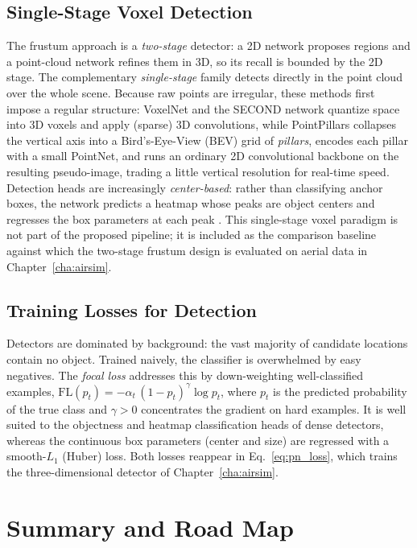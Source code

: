 \subsection{Single-Stage Voxel Detection}

The frustum approach is a \emph{two-stage} detector: a 2D network proposes
regions and a point-cloud network refines them in 3D, so its recall is bounded by
the 2D stage. The complementary \emph{single-stage} family detects directly in
the point cloud over the whole scene. Because raw points are irregular, these
methods first impose a regular structure: VoxelNet and the SECOND network
\cite{yan2018second} quantize space into 3D voxels and apply (sparse) 3D
convolutions, while PointPillars \cite{lang2019pointpillars} collapses the
vertical axis into a Bird's-Eye-View (BEV) grid of \emph{pillars}, encodes each
pillar with a small PointNet, and runs an ordinary 2D convolutional backbone on
the resulting pseudo-image, trading a little vertical resolution for real-time
speed. Detection heads are increasingly \emph{center-based}: rather than
classifying anchor boxes, the network predicts a heatmap whose peaks are object
centers and regresses the box parameters at each peak \cite{zhou2019objects}.
This single-stage voxel paradigm is not part of the proposed pipeline; it is
included as the comparison baseline against which the two-stage frustum design is
evaluated on aerial data in Chapter~\ref{cha:airsim}.

\subsection{Training Losses for Detection}

Detectors are dominated by background: the vast majority of candidate locations
contain no object. Trained naively, the classifier is overwhelmed by easy
negatives. The \emph{focal loss} \cite{lin2017focal} addresses this by
down-weighting well-classified examples,
$\mathrm{FL}(p_t)=-\alpha_t\,(1-p_t)^{\gamma}\log p_t$, where $p_t$ is the
predicted probability of the true class and $\gamma>0$ concentrates the gradient
on hard examples. It is well suited to the objectness and heatmap classification
heads of dense detectors, whereas the continuous box parameters (center and size)
are regressed with a smooth-$L_1$ (Huber) loss. Both losses reappear in
Eq.~\eqref{eq:pn_loss}, which trains the three-dimensional detector of
Chapter~\ref{cha:airsim}.

\section*{Summary and Road Map}

